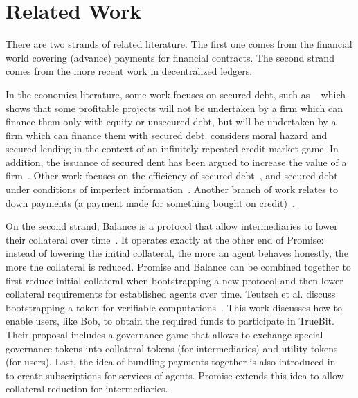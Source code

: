 \documentclass[runningheads]{llncs}
\newcommand{\sys}{Promise\xspace}
\newcommand{\tolgu}[1]{\todo[linecolor=yellow,backgroundcolor=yellow!25,bordercolor=yellow,inline,caption={}]{Todo for Lewis: #1}}
\begin{document}


\section{Related Work}
\label{sec:related}




There are two strands of related literature.
The first one comes from the financial world covering (advance) payments for financial contracts.
The second strand comes from the more recent work in decentralized ledgers.

In the economics literature, some work focuses on secured debt, such as ~\cite{stulz1985analysis} which shows that some profitable projects will not be undertaken by a firm which can finance them only with equity or unsecured debt, but will be undertaken by a firm which can finance them with secured debt.
\cite{boot1994moral} considers moral hazard and secured lending in the context of an infinitely repeated credit market game. 
In addition, the issuance of secured dent has been argued to increase the value of a firm~\cite{scott1977bankruptcy}.
Other work focuses on the efficiency of secured debt~\cite{hill2001secured}, and secured debt under conditions of imperfect information~\cite{triantis1992secured}.
Another branch of work relates to down payments (a payment made for something bought on credit)~\cite{engelhardt,mayer1996gifts,engelhardt1994house}. 


On the second strand, Balance is a protocol that allow intermediaries to lower their collateral over time~\cite{Harz2019Balance}.
It operates exactly at the other end of \sys: instead of lowering the initial collateral, the more an agent behaves honestly, the more the collateral is reduced.
\sys and Balance can be combined together to first reduce initial collateral when bootstrapping a new protocol and then lower collateral requirements for established agents over time.
Teutsch et al. discuss bootstrapping a token for verifiable computations~\cite{Teutsch2019Boostrap}.
This work discusses how to enable users, like Bob, to obtain the required funds to participate in TrueBit.
Their proposal includes a governance game that allows to exchange special governance tokens into collateral tokens (for intermediaries) and utility tokens (for users).
Last, the idea of bundling payments together is also introduced in ~\cite{Berg2018} to create subscriptions for services of agents.
\sys extends this idea to allow collateral reduction for intermediaries.
\end{document}
